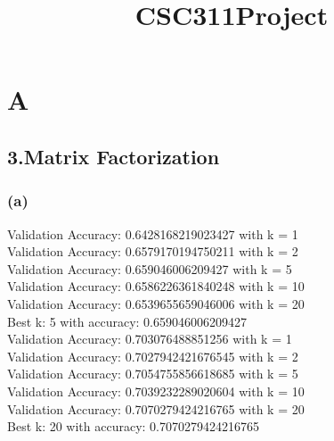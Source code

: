 \documentclass{article}
\title{CSC311Project}
\begin{document}
\maketitle



\section*{A}
\subsection*{3.Matrix Factorization}
\subsubsection*{(a)}
Validation Accuracy: 0.6428168219023427 with k = 1\\
Validation Accuracy: 0.6579170194750211 with k = 2\\
Validation Accuracy: 0.659046006209427 with k = 5\\
Validation Accuracy: 0.6586226361840248 with k = 10\\
Validation Accuracy: 0.6539655659046006 with k = 20\\
Best k: 5 with accuracy: 0.659046006209427\\
Validation Accuracy: 0.703076488851256 with k = 1\\
Validation Accuracy: 0.7027942421676545 with k = 2\\
Validation Accuracy: 0.7054755856618685 with k = 5\\
Validation Accuracy: 0.7039232289020604 with k = 10\\
Validation Accuracy: 0.7070279424216765 with k = 20\\
Best k: 20 with accuracy: 0.7070279424216765\\
\end{document}
